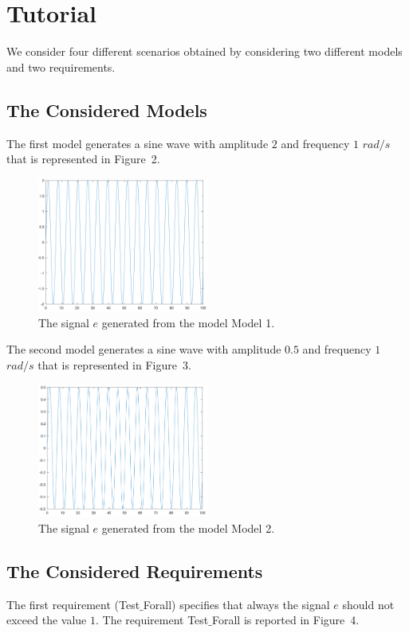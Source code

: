 \documentclass[12pt]{extarticle}
\newcommand{\<}{\langle}
\renewcommand{\>}{\rangle}
\theoremstyle{definition}
\begin{document}
\clearpage
\section{Tutorial}
We consider four different scenarios obtained by considering two different models and two requirements.

\subsection{The Considered Models}
The first model generates a sine wave with amplitude $2$ and frequency $1$ $rad/s$ that is represented in Figure~2.

\begin{figure}[h]
\caption{The signal $e$ generated from the model Model 1.}
  \centering
    \includegraphics[width=0.5\textwidth]{Manual/Model1.png}
\end{figure}

\noindent The second model generates a sine wave with amplitude $0.5$ and frequency $1$ $rad/s$ that is represented in Figure~3.

\begin{figure}[h]
\caption{The signal $e$ generated from the model Model 2.}
  \centering
    \includegraphics[width=0.5\textwidth]{Manual/Model2.png}
\end{figure}

\subsection{The Considered Requirements}
The first requirement (Test$\_$Forall) specifies that always the signal $e$ should not exceed the value $1$.
The requirement  Test$\_$Forall is reported in Figure~4.
\end{document}
